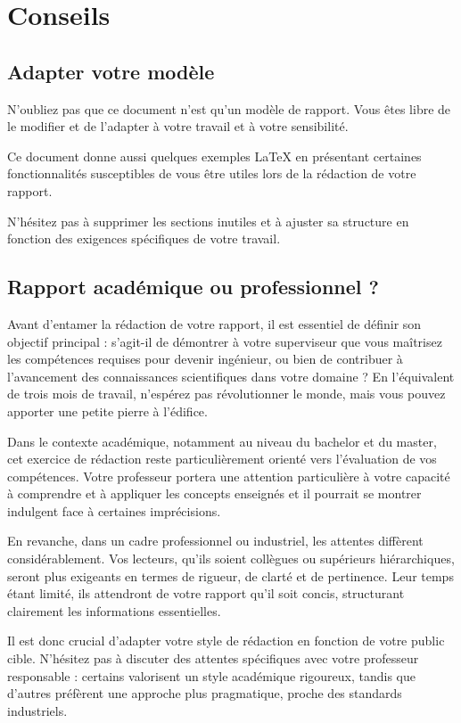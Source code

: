 \chapter{Conseils}

\section{Adapter votre modèle}

N'oubliez pas que ce document n'est qu'un modèle de rapport. Vous êtes libre de le modifier et de l'adapter à votre travail et à votre sensibilité.

Ce document donne aussi quelques exemples \LaTeX{} en présentant certaines fonctionnalités susceptibles de vous être utiles lors de la rédaction de votre rapport.

N'hésitez pas à supprimer les sections inutiles et à ajuster sa structure en fonction des exigences spécifiques de votre travail.

\section{Rapport académique ou professionnel ?}

Avant d'entamer la rédaction de votre rapport, il est essentiel de définir son objectif principal : s'agit-il de démontrer à votre superviseur que vous maîtrisez les compétences requises pour devenir ingénieur, ou bien de contribuer à l'avancement des connaissances scientifiques dans votre domaine ? En l'équivalent de trois mois de travail, n'espérez pas révolutionner le monde, mais vous pouvez apporter une petite pierre à l'édifice.

Dans le contexte académique, notamment au niveau du bachelor et du master, cet exercice de rédaction reste particulièrement orienté vers l'évaluation de vos compétences. Votre professeur portera une attention particulière à votre capacité à comprendre et à appliquer les concepts enseignés et il pourrait se montrer indulgent face à certaines imprécisions.

En revanche, dans un cadre professionnel ou industriel, les attentes diffèrent considérablement. Vos lecteurs, qu'ils soient collègues ou supérieurs hiérarchiques, seront plus exigeants en termes de rigueur, de clarté et de pertinence. Leur temps étant limité, ils attendront de votre rapport qu'il soit concis, structurant clairement les informations essentielles.

Il est donc crucial d'adapter votre style de rédaction en fonction de votre public cible. N'hésitez pas à discuter des attentes spécifiques avec votre professeur responsable : certains valorisent un style académique rigoureux, tandis que d'autres préfèrent une approche plus pragmatique, proche des standards industriels.

